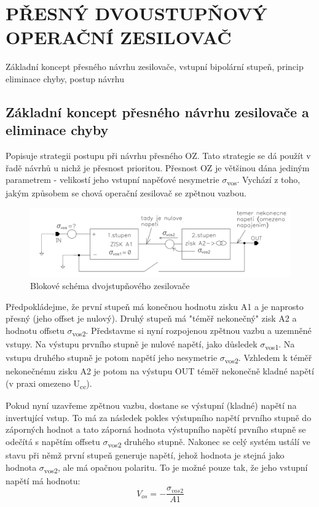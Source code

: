 \section{PŘESNÝ DVOUSTUPŇOVÝ OPERAČNÍ ZESILOVAČ}
Základní koncept přesného návrhu zesilovače, vstupní bipolární stupeň, princip eliminace chyby, postup návrhu

\subsection{Základní koncept přesného návrhu zesilovače a eliminace chyby}
Popisuje strategii postupu při návrhu přesného OZ. Tato strategie se dá použít v řadě návrhů u nichž je přesnost prioritou. Přesnost OZ je většinou dána jediným parametrem - velikostí jeho vstupní napěťové nesymetrie $\sigma$\textsubscript{vos}. Vychází z toho, jakým způsobem se chová operační zesilovač se zpětnou vazbou.

\begin{figure}[h]
   \begin{center}
     \includegraphics[scale=0.5]{images/dvojOZ.png}
   \end{center}
   \caption{Blokové schéma dvojstupňového zesilovače}
\end{figure}

Předpokládejme, že první stupeň má konečnou hodnotu zisku A1 a je naprosto přesný (jeho offset je nulový). Druhý stupeň má "téměř nekonečný" zisk A2 a hodnotu offsetu $\sigma$\textsubscript{vos2}. Představme si nyní rozpojenou zpětnou vazbu a uzemněné vstupy. Na výstupu prvního stupně je nulové napětí, jako důsledek $\sigma$\textsubscript{vos1}. Na vstupu druhého stupně je potom napětí jeho nesymetrie $\sigma$\textsubscript{vos2}. Vzhledem k téměř nekonečnému zisku A2 je potom na výstupu OUT téměř nekonečně kladné napětí (v praxi omezeno U\textsubscript{cc}). 

Pokud nyní uzavřeme zpětnou vazbu, dostane se výstupní (kladné) napětí na invertující vstup. To má za následek pokles výstupního napětí prvního stupně do záporných hodnot a tato záporná hodnota výstupního napětí prvního stupně se odečítá s napětím offsetu $\sigma$\textsubscript{vos2} druhého stupně. Nakonec se celý systém ustálí ve stavu při němž první stupeň generuje napětí, jehož hodnota je stejná jako hodnota $\sigma$\textsubscript{vos2}, ale má opačnou polaritu. To je možné pouze tak, že jeho vstupní napětí má hodnotu:
\begin{equation}
V_{os} = -\frac{\sigma_{vos2}}{A1}
\end{equation}

